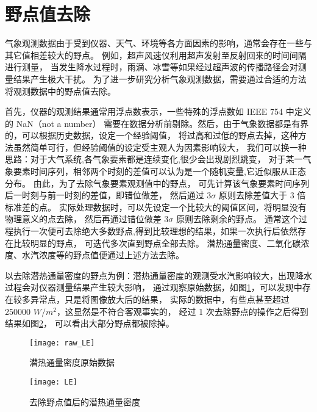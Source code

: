 \section{野点值去除}
气象观测数据由于受到仪器、天气、环境等各方面因素的影响，通常会存在一些与其它值相差较大的野点。
例如，超声风速仪利用超声发射至反射回来的时间间隔进行测量，
当发生降水过程时，雨滴、冰雪等如果经过超声波的传播路径会对测量结果产生极大干扰。
为了进一步研究分析气象观测数据，需要通过合适的方法将观测数据中的野点值去除。

首先，仪器的观测结果通常用浮点数表示，一些特殊的浮点数如 IEEE 754 中定义的 NaN（not a number）
需要在数据分析前剔除。然后，由于气象数据都是有界的，可以根据历史数据，设定一个经验阈值，
将过高和过低的野点去掉，这种方法虽然简单可行，但经验阈值的设定受主观人为因素影响较大，
我们可以换一种思路：对于大气系统,各气象要素都是连续变化,很少会出现剧烈跳变，
对于某一气象要素时间序列，相邻两个时刻的差值可以认为是一个随机变量,它近似服从正态分布。
由此，为了去除气象要素观测值中的野点，
可先计算该气象要素时间序列后一时刻与前一时刻的差值，即错位做差，
然后通过 3$\sigma$ 原则去除差值大于 3 倍标准差的点。
实际处理数据时，可以先设定一个比较大的阈值区间，将明显没有物理意义的点去除，
然后再通过错位做差 3$\sigma$ 原则去除剩余的野点。
通常这个过程执行一次便可去除绝大多数野点,得到比较理想的结果，如果一次执行后依然存在比较明显的野点，
可迭代多次直到野点全部去除。
潜热通量密度、二氧化碳浓度、水汽浓度等的野点值便通过上述方法去除。

以去除潜热通量密度的野点为例：潜热通量密度的观测受水汽影响较大，出现降水过程会对仪器测量结果产生较大影响，
通过观察原始数据，如图\ref{fig:raw_LE}，可以发现中存在较多异常点，只是将图像放大后的结果，
实际的数据中，有些点甚至超过 250000 $W/m^{2}$，这显然是不符合客观事实的，
经过 1 次去除野点的操作之后得到结果如图\ref{fig:LE}，
可以看出大部分野点都被除掉。
\begin{figure}[H]
\centering
\texttt{[image: raw\_LE]}
\caption{潜热通量密度原始数据}\label{fig:raw_LE}
\end{figure}
\begin{figure}[H]
\centering
\texttt{[image: LE]}
\caption{去除野点值后的潜热通量密度}\label{fig:LE}
\end{figure}

